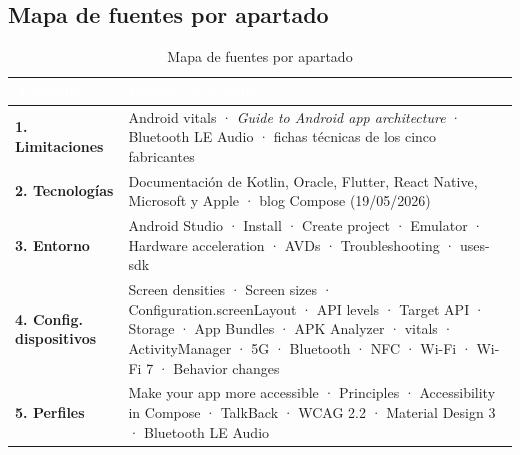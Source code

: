 \documentclass[11pt,a4paper]{article}
\begin{document}
	\subsection*{Mapa de fuentes por apartado}
	
	{\small
		\begin{table}[htbp]
			\centering
			\begin{tabularx}{\textwidth}{@{}>{\RaggedRight\arraybackslash}p{3.5cm} >{\RaggedRight\arraybackslash}X@{}}
				\toprule
				\rowcolor{primary}
				\textcolor{white}{\sffamily\bfseries Apartado} & \textcolor{white}{\sffamily\bfseries Fuentes principales} \\
				\midrule
				\textbf{1. Limitaciones} & Android vitals · \emph{Guide to Android app architecture} · Bluetooth LE Audio · fichas técnicas de los cinco fabricantes \\
				\rowcolor{soft}
				\textbf{2. Tecnologías} & Documentación de Kotlin, Oracle, Flutter, React Native, Microsoft y Apple · blog Compose (19/05/2026) \\
				\textbf{3. Entorno} & Android Studio · Install · Create project · Emulator · Hardware acceleration · AVDs · Troubleshooting · uses-sdk \\
				\rowcolor{soft}
				\textbf{4. Config. dispositivos} & Screen densities · Screen sizes · Configuration.screenLayout · API levels · Target API · Storage · App Bundles · APK Analyzer · vitals · ActivityManager · 5G · Bluetooth · NFC · Wi-Fi · Wi-Fi 7 · Behavior changes \\
				\textbf{5. Perfiles} & Make your app more accessible · Principles · Accessibility in Compose · TalkBack · WCAG 2.2 · Material Design 3 · Bluetooth LE Audio \\
				\bottomrule
			\end{tabularx}
			\caption{Mapa de fuentes por apartado}
		\end{table}
	}
	
\end{document}
